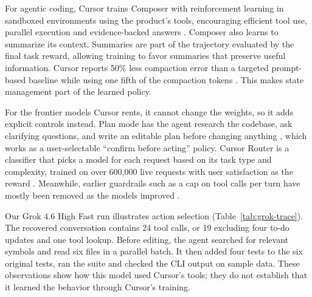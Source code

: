 \documentclass[11pt]{article}
\begin{document}
For agentic coding, Cursor trains Composer with reinforcement learning in sandboxed environments using the product's tools, encouraging efficient tool use, parallel execution and evidence-backed answers \citep{cursor2025composer}. Composer also learns to summarize its context. Summaries are part of the trajectory evaluated by the final task reward, allowing training to favor summaries that preserve useful information. Cursor reports 50\% less compaction error than a targeted prompt-based baseline while using one fifth of the compaction tokens \citep{cassano2026composer}. This makes state management part of the learned policy.

For the frontier models Cursor rents, it cannot change the weights, so it adds explicit controls instead. Plan mode has the agent research the codebase, ask clarifying questions, and write an editable plan before changing anything \citep{smith2025planmode}, which works as a user-selectable ``confirm before acting'' policy. Cursor Router is a classifier that picks a model for each request based on its task type and complexity, trained on over 600,000 live requests with user satisfaction as the reward \citep{cursor2026router}. Meanwhile, earlier guardrails such as a cap on tool calls per turn have mostly been removed as the models improved \citep{heule2026harness}.

Our Grok 4.6 High Fast run illustrates action selection (Table~\ref{tab:grok-trace}). The recovered conversation contains 24 tool calls, or 19 excluding four to-do updates and one tool lookup. Before editing, the agent searched for relevant symbols and read six files in a parallel batch. It then added four tests to the six original tests, ran the suite and checked the CLI output on sample data. These observations show how this model used Cursor's tools; they do not establish that it learned the behavior through Cursor's training.
\end{document}

